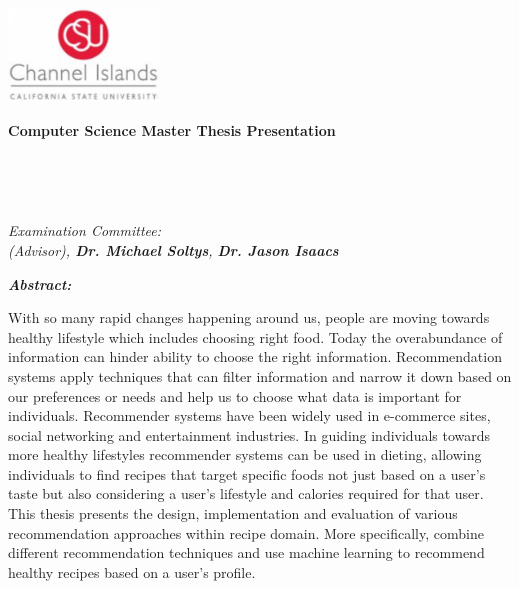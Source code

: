 \documentclass{article}
\begin{document}
\begin{center}

\includegraphics[width=0.3\textwidth]{media/ci-logo.png}\\

\hfill\break

\LARGE
\textbf{\color{grey}Computer Science Master Thesis Presentation}\\

\hfill\break
\hfill\break

\Large
{\bf \thesistitle}\\

\vspace{5mm}

\large
{\bf \studentname}\\

\vspace{5mm}

\large
\textit{ Examination Committee:\\
{\bf \advisorname} (Advisor), {\bf Dr. Michael Soltys}, {\bf
Dr. Jason Isaacs}}\\

\hfill\break

\end{center}

\begin{adjustwidth}{1in}{1in}
\textit{\bf Abstract:}\\

\vspace{3mm}

\normalsize
\noindent With so many rapid changes happening around us, people are moving towards healthy lifestyle which includes choosing right food. Today the overabundance of information can hinder ability to choose the right information. Recommendation systems apply techniques that can filter information and narrow it down based on our preferences or needs and help us to choose what data is important for individuals. Recommender systems have been widely used in e-commerce sites, social networking and entertainment industries. In guiding individuals towards more healthy lifestyles recommender systems can be used in dieting, allowing individuals to find recipes that target specific foods not just based on a user's taste but also considering a user's lifestyle and calories required for that user. This thesis presents the design, implementation and evaluation of various recommendation approaches within recipe domain. More specifically, combine different recommendation techniques and use machine learning to recommend healthy recipes based on a user's profile.

\end{adjustwidth}
\end{document}
